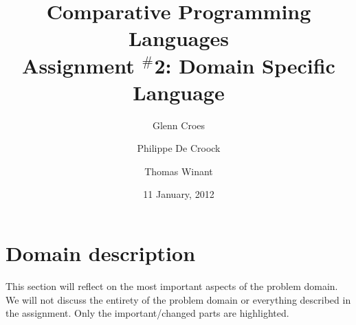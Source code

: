 \documentclass[a4paper]{article}
\begin{document}

\title{Comparative Programming Languages\\
Assignment $^{\#}$2: Domain Specific Language}
\author{Glenn Croes \and Philippe De Croock \and Thomas Winant}
\date{11 January, 2012}

\maketitle

\tableofcontents

\section{Domain description}
\label{sec:domain-description}




This section will reflect on the most important aspects of the problem domain.
We will not discuss the entirety of the problem domain or everything described in the assignment.
Only the important/changed parts are highlighted.
\end{document}
